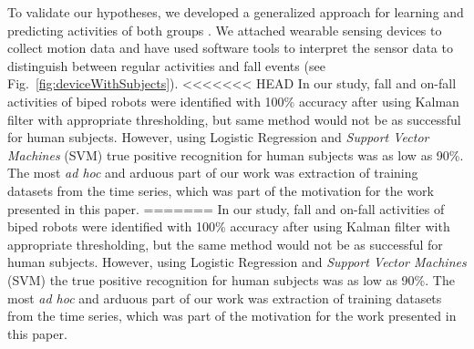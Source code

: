 \documentclass[]{IEEEtran}
\begin{document}
\par
To validate our hypotheses, we developed a generalized approach for learning 
and predicting activities of both groups \cite{abeyruwanFlairs2015}.  We attached wearable sensing devices to collect
motion data and have used software tools to interpret the sensor data to distinguish 
between regular activities and fall events (see Fig.~\ref{fig:deviceWithSubjects}). 
<<<<<<< HEAD
In our study, fall and on-fall activities of biped robots were identified with 100\%  accuracy after using Kalman filter \cite{Welch:1995:IKF:897831} with appropriate thresholding, but same method would not be as successful for human subjects.  However, using Logistic Regression and \emph{Support Vector Machines} (SVM) true positive recognition for human subjects was as low as 90\%. The most \emph{ad hoc} and arduous part of our work was extraction of training datasets from the time series, which was part of the motivation for the work presented in this paper.
=======
In our study, fall and on-fall activities of biped robots were identified with 100\%  accuracy after using Kalman filter \cite{Welch:1995:IKF:897831} with appropriate thresholding, but the same method would not be as successful for human subjects.  However, using Logistic Regression and \emph{Support Vector Machines} (SVM) the true positive recognition for human subjects was as low as 90\%. The most \emph{ad hoc} and arduous part of our work was extraction of training datasets from the time series, which was part of the motivation for the work presented in this paper.

%
\end{document}

